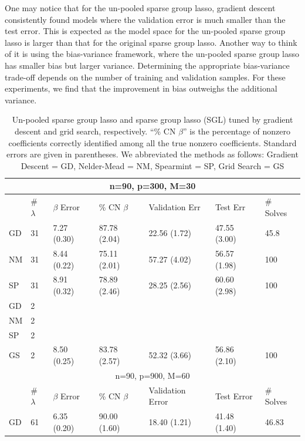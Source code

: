 \documentclass[12pt]{article}
\begin{document}
One may notice that for the un-pooled sparse group lasso, gradient descent consistently found models where the validation error is much smaller than the test error. This is expected as the model space for the un-pooled sparse group lasso is larger than that for the original sparse group lasso. Another way to think of it is using the bias-variance framework, where the un-pooled sparse group lasso has smaller bias but larger variance. Determining the appropriate bias-variance trade-off depends on the number of training and validation samples. For these experiments, we find that the improvement in bias outweighs the additional variance.

\begin{table}
\caption{\label{table:unpooled} Un-pooled sparse group lasso and sparse group lasso (SGL) tuned by gradient descent and grid search, respectively. ``\% CN $\beta$'' is the percentage of nonzero coefficients correctly identified among all the true nonzero coefficients. Standard errors are given in parentheses. We abbreviated the methods as follows: Gradient Descent = GD, Nelder-Mead = NM, Spearmint = SP, Grid Search = GS}
\centering
\begin{tabular}{| l | l | l | l | l | l | l |}
\hline
\multicolumn{7}{|c|}{n=90, p=300, M=30}\\
\hline
& \# $\lambda$ & $\beta$ Error & \% CN $\beta$ & Validation Err & Test Err & \# Solves \\
\hline
GD & 31 & 7.27 (0.30) & 87.78 (2.04) & 22.56 (1.72) & 47.55 (3.00) & 45.8 \\
\hline
NM & 31 & 8.44 (0.22) & 75.11 (2.01) & 57.27 (4.02) & 56.57 (1.98) & 100\\
\hline
SP & 31 & 8.91 (0.32) & 78.89 (2.46) & 28.25 (2.56) & 60.60 (2.98) & 100\\
\hline
GD & 2 & & & & & \\
\hline
NM & 2 & & & & & \\
\hline
SP & 2 &  & & & & \\
\hline
GS & 2 & 8.50 (0.25) & 83.78 (2.57) & 52.32 (3.66) & 56.86 (2.10) & 100 \\
\hline
\multicolumn{7}{|c|}{n=90, p=900, M=60}\\
\hline
& \# $\lambda$ & $\beta$ Error & \% CN $\beta$ & Validation Error & Test Error & \# Solves \\
\hline
GD & 61 & 6.35 (0.20) & 90.00 (1.60) & 18.40 (1.21) & 41.48 (1.40) & 46.83 \\

\end{tabular}
\end{table}
\end{document}
